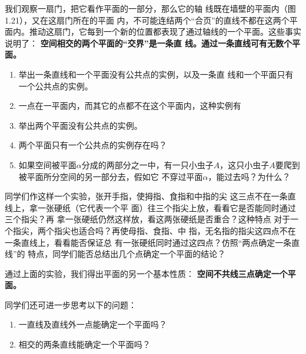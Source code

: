 我们观察一扇门，把它看作平面的一部分，那么它的轴
线既在墙壁的平面内（图1.21），又在这扇门所在的平面
内，不可能连结两个“合页”的直线不都在这两个平面内。推动这扇门，它每到一个新的位置都表现了通过轴线的一个平面。这些事实说明了：
\textbf{空间相交的两个平面的“交界”是一条直
线。通过一条直线可有无数个平面。}

\begin{ex}
\begin{enumerate}
	\item 举出一条直线和一个平面没有公共点的实例，以及一条直
	线和一个平面只有一个公共点的实例。
	\item 一点在一平面内，而其它的点都不在这个平面内，这种实例有\item 举出两个平面没有公共点的实例。
	\item 两个平面只有一个公共点的实例存在吗？
	\item 如果空间被平面$\alpha$分成的两部分之一中，有一只小虫子$A$，这只小虫子$A$要爬到	被平面所分空间的另一部分去，假如它
	不穿过平面$\alpha$，能过去吗？为什么？
\begin{center}
	\begin{tikzpicture}
		
	\end{tikzpicture}
\end{center}
\end{enumerate}
\end{ex}

同学们作这样一个实验，张开手指，使拇指、食指和中指的尖
这三点不在一条直线上，拿一张硬纸（它代表一个平
面）往三个指尖上放，看看它是否能同时通过三个指尖？再
拿一张硬纸仍然这样放，看这两张硬纸是否重合？这种特点
对于一个指尖，两个指尖也适合吗？再使母指、食指、中
指，无名指的指尖这四点不在一条直线上，看看能否保证总
有一张硬纸同时通过这四点？仿照“两点确定一条直线”的
特点，同学们能否总结出几个点确定一个平面的结论？

通过上面的实验，我们得出平面的另一个基本性质：
\textbf{空间不共线三点确定一个平面。}

同学们还可进一步思考以下的问题：
\begin{enumerate}
	\item 一直线及直线外一点能确定一个平面吗？
	\item 相交的两条直线能确定一个平面吗？
\end{enumerate}

